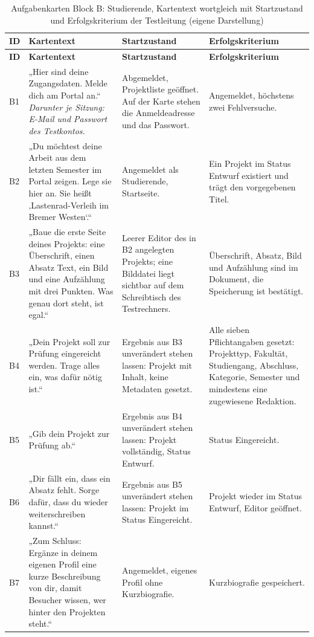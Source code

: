 \begingroup
\scriptsize
\setlength{\tabcolsep}{3pt}
\renewcommand{\arraystretch}{1.12}
\setlength{\LTcapwidth}{\textwidth}
\begin{longtable}{@{}L{0.6cm}L{6.1cm}L{3.8cm}L{4.2cm}@{}}
	\caption[Aufgabenkarten Block B: Studierende]{Aufgabenkarten Block B: Studierende, Kartentext wortgleich mit Startzustand und Erfolgskriterium der Testleitung (eigene Darstellung)}
	\label{tab:karten-b}\\
	\toprule
	\textbf{ID} & \textbf{Kartentext} & \textbf{Startzustand} & \textbf{Erfolgskriterium} \\
	\midrule
	\endfirsthead
	\toprule
	\textbf{ID} & \textbf{Kartentext} & \textbf{Startzustand} & \textbf{Erfolgskriterium} \\
	\midrule
	\endhead
	\bottomrule
	\endfoot
	B1 & „Hier sind deine Zugangsdaten. Melde dich am Portal an.“ \newline \textit{Darunter je Sitzung: E-Mail und Passwort des Testkontos.} & Abgemeldet, Projektliste geöffnet. Auf der Karte stehen die Anmeldeadresse und das Passwort. & Angemeldet, höchstens zwei Fehlversuche. \\
	B2 & „Du möchtest deine Arbeit aus dem letzten Semester im Portal zeigen. Lege sie hier an. Sie heißt ‚Lastenrad-Verleih im Bremer Westen‘.“ & Angemeldet als Studierende, Startseite. & Ein Projekt im Status Entwurf existiert und trägt den vorgegebenen Titel. \\
	B3 & „Baue die erste Seite deines Projekts: eine Überschrift, einen Absatz Text, ein Bild und eine Aufzählung mit drei Punkten. Was genau dort steht, ist egal.“ & Leerer Editor des in B2 angelegten Projekts; eine Bilddatei liegt sichtbar auf dem Schreibtisch des Testrechners. & Überschrift, Absatz, Bild und Aufzählung sind im Dokument, die Speicherung ist bestätigt. \\
	B4 & „Dein Projekt soll zur Prüfung eingereicht werden. Trage alles ein, was dafür nötig ist.“ & Ergebnis aus B3 unverändert stehen lassen: Projekt mit Inhalt, keine Metadaten gesetzt. & Alle sieben Pflichtangaben gesetzt: Projekttyp, Fakultät, Studiengang, Abschluss, Kategorie, Semester und mindestens eine zugewiesene Redaktion. \\
	B5 & „Gib dein Projekt zur Prüfung ab.“ & Ergebnis aus B4 unverändert stehen lassen: Projekt vollständig, Status Entwurf. & Status Eingereicht. \\
	B6 & „Dir fällt ein, dass ein Absatz fehlt. Sorge dafür, dass du wieder weiterschreiben kannst.“ & Ergebnis aus B5 unverändert stehen lassen: Projekt im Status Eingereicht. & Projekt wieder im Status Entwurf, Editor geöffnet. \\
	B7 & „Zum Schluss: Ergänze in deinem eigenen Profil eine kurze Beschreibung von dir, damit Besucher wissen, wer hinter den Projekten steht.“ & Angemeldet, eigenes Profil ohne Kurzbiografie. & Kurzbiografie gespeichert. \\
\end{longtable}
\endgroup

